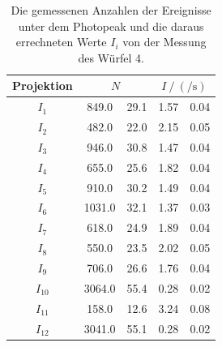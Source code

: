   \begin{table}[H]
    \centering
    \caption{Die gemessenen Anzahlen der Ereignisse unter dem Photopeak und die daraus errechneten Werte $I_i$ von der Messung des Würfel 4.}
    \label{tab:w4}
    \begin{tabular}{c S[table-format=4.1] @{${}\pm{}$} S[table-format=2.1] S[table-format=1.2] @{${}\pm{}$} S[table-format=1.2] }
      \toprule
      {Projektion} &  &  \\
      \midrule
      $I_1 $   &  849.0 & 29.1 &  1.57 & 0.04 \\
      $I_2 $   &  482.0 & 22.0 &  2.15 & 0.05 \\
      $I_3 $   &  946.0 & 30.8 &  1.47 & 0.04 \\
      $I_4 $   &  655.0 & 25.6 &  1.82 & 0.04 \\
      $I_5 $   &  910.0 & 30.2 &  1.49 & 0.04 \\
      $I_6 $   & 1031.0 & 32.1 &  1.37 & 0.03 \\
      $I_7 $   &  618.0 & 24.9 &  1.89 & 0.04 \\
      $I_8 $   &  550.0 & 23.5 &  2.02 & 0.05 \\
      $I_9 $   &  706.0 & 26.6 &  1.76 & 0.04 \\
      $I_{10}$ & 3064.0 & 55.4 &  0.28 & 0.02 \\
      $I_{11}$ &  158.0 & 12.6 &  3.24 & 0.08 \\
      $I_{12}$ & 3041.0 & 55.1 &  0.28 & 0.02 \\
      \bottomrule
    \end{tabular}
  \end{table}

